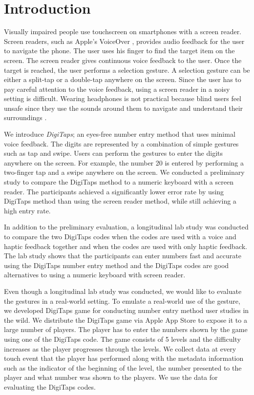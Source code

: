 \section{Introduction}
\label{sec:intro}

Visually impaired people use touchscreen on smartphones with a screen reader. Screen readers, such as Apple's VoiceOver \cite{VoiceOver:2014}, provides audio feedback for the user to navigate the phone. The user uses his finger to find the target item on the screen. The screen reader gives continuous voice feedback to the user. Once the target is reached, the user performs a selection gesture. A selection gesture can be either a split-tap or a double-tap anywhere on the screen. Since the user has to pay careful attention to the voice feedback, using a screen reader in a noisy setting is difficult. Wearing headphones is not practical because blind users feel unsafe since they use the sounds around them to navigate and understand their surroundings \cite{Azenkot:2011}.
\par
We introduce \textit{DigiTaps}; an eyes-free number entry method that uses minimal voice feedback. The digits are represented by a combination of simple gestures such as tap and swipe. Users can perform the gestures to enter the digits anywhere on the screen. For example, the number 20 is entered by performing a two-finger tap and a swipe anywhere on the screen. We conducted a preliminary study to compare the DigiTaps method to a numeric keyboard with a screen reader. The participants achieved a significantly lower error rate by using DigiTaps method than using the screen reader method, while still achieving a high entry rate.
\par
In addition to the preliminary evaluation, a longitudinal lab study was conducted to compare the two DigiTaps codes when the codes are used with a voice and haptic feedback together and when the codes are used with only haptic feedback. The lab study shows that the participants can enter numbers fast and accurate using the DigiTaps number entry method and the DigiTaps codes are good alternatives to using a numeric keyboard with screen reader. \cite{Azenkot:2013}
\par
Even though a longitudinal lab study was conducted, we would like to evaluate the gestures in a real-world setting. To emulate a real-world use of the gesture, we developed DigiTaps game for conducting number entry method user studies in the wild. We distribute the DigiTaps game via Apple App Store to expose it to a large number of players. The player has to enter the numbers shown by the game using one of the DigiTaps code. The game consists of 5 levels and the difficulty increases as the player progresses through the levels. We collect data at every touch event that the player has performed along with the metadata information such as the indicator of the beginning of the level, the number presented to the player and what number was shown to the players. We use the data for evaluating the DigiTaps codes.

\begin{comment}
Outline:
  - Background on why we come up with DigiTaps code: Continuous feedback hard to use in a noisy setting.
  - evidence of other method presented
  - why DigiTaps game? DigiTaps game is for what?

\end{comment}
